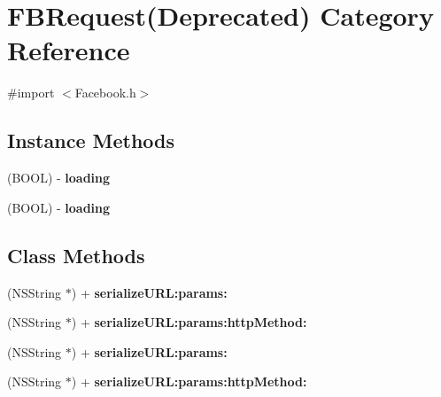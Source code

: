 \hypertarget{categoryFBRequest_07Deprecated_08}{}\section{F\+B\+Request(Deprecated) Category Reference}
\label{categoryFBRequest_07Deprecated_08}


{\ttfamily \#import $<$Facebook.\+h$>$}

\subsection*{Instance Methods}
\begin{DoxyCompactItemize}
\item 
\mbox{\label{categoryFBRequest_07Deprecated_08_adf98c14f4021581a3d762d9c2fa29339}} 
(B\+O\+OL) -\/ {\bfseries loading}
\item 
\mbox{\label{categoryFBRequest_07Deprecated_08_adf98c14f4021581a3d762d9c2fa29339}} 
(B\+O\+OL) -\/ {\bfseries loading}
\end{DoxyCompactItemize}
\subsection*{Class Methods}
\begin{DoxyCompactItemize}
\item 
\mbox{\label{categoryFBRequest_07Deprecated_08_a9af2ee5d05bb50e35d4104b2a63d45fe}} 
(N\+S\+String $\ast$) + {\bfseries serialize\+U\+R\+L\+:params\+:}
\item 
\mbox{\label{categoryFBRequest_07Deprecated_08_a498b1abe723bbd55987c69ab2ede78ae}} 
(N\+S\+String $\ast$) + {\bfseries serialize\+U\+R\+L\+:params\+:http\+Method\+:}
\item 
\mbox{\label{categoryFBRequest_07Deprecated_08_a9af2ee5d05bb50e35d4104b2a63d45fe}} 
(N\+S\+String $\ast$) + {\bfseries serialize\+U\+R\+L\+:params\+:}
\item 
\mbox{\label{categoryFBRequest_07Deprecated_08_a498b1abe723bbd55987c69ab2ede78ae}} 
(N\+S\+String $\ast$) + {\bfseries serialize\+U\+R\+L\+:params\+:http\+Method\+:}
\end{DoxyCompactItemize}

